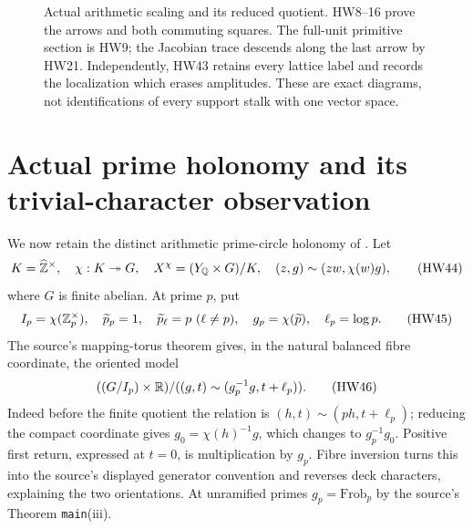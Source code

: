 \begin{figure}[ht]
\centering
{}
\caption{Actual arithmetic scaling and its reduced quotient.
HW8--16 prove the arrows and both commuting squares.
The full-unit primitive section is HW9; the Jacobian trace
descends along the last arrow by HW21. Independently, HW43
retains every lattice label and records the localization
which erases amplitudes. These are exact diagrams, not
identifications of every support stalk with one vector space.}
\end{figure}

\section{Actual prime holonomy and its trivial-character observation}

We now retain the distinct arithmetic prime-circle holonomy
of \cite{HW-CCclass}. Let
\[
 K=\widehat{\mathbb Z}^\times,\quad \chi:K\twoheadrightarrow G,\quad
 X^\chi=(Y_\mathbb Q\times G)/K,\quad
 (z,g)\sim(zw,\chi(w)g),
 \tag{HW44}
\]
where \(G\) is finite abelian. At prime \(p\), put
\[
 I_p=\chi(\mathbb Z_p^\times),\quad
 \widetilde p_p=1,\quad\widetilde p_\ell=p\ (\ell\ne p),\quad
 g_p=\chi(\widetilde p),\quad \ell_p=\log p .
 \tag{HW45}
\]
The source's mapping-torus theorem gives, in the natural
balanced fibre coordinate, the oriented model
\[
 ((G/I_p)\times\mathbb R)/
        ((g,t)\sim(g_p^{-1}g,t+\ell_p)).
 \tag{HW46}
\]
Indeed before the finite quotient the relation is
\((h,t)\sim(ph,t+\ell_p)\); reducing the compact coordinate
gives \(g_0=\chi(h)^{-1}g\), which changes to
\(g_p^{-1}g_0\). Positive first return, expressed at \(t=0\),
is multiplication by \(g_p\). Fibre inversion turns this
into the source's displayed generator convention and
reverses deck characters, explaining the two orientations.
At unramified primes \(g_p=\mathrm{Frob}_p\) by the source's
Theorem \texttt{main}(iii).

